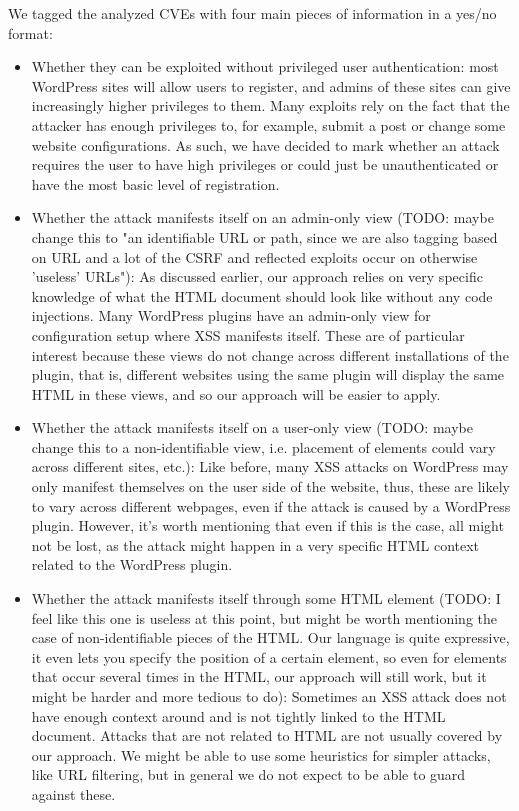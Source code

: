 We tagged the analyzed CVEs with four main pieces of information in a yes/no format:
\begin{itemize}
	\item Whether they can be exploited without privileged user authentication: most WordPress sites will allow users to register, and admins of these sites can give increasingly higher privileges to them. Many exploits rely on the fact that the attacker has enough privileges to, for example, submit a post or change some website configurations. As such, we have decided to mark whether an attack requires the user to have high privileges or could just be unauthenticated or have the most basic level of registration. 
	\item Whether the attack manifests itself on an admin-only view (TODO: maybe change this to "an identifiable URL or path, since we are also tagging based on URL and a lot of the CSRF and reflected exploits occur on otherwise 'useless' URLs"): As discussed earlier, our approach relies on very specific knowledge of what the HTML document should look like without any code injections. Many WordPress plugins have an admin-only view for configuration setup where \ac{XSS} manifests itself. These are of particular interest because these views do not change across different installations of the plugin, that is, different websites using the same plugin will display the same HTML in these views, and so our approach will be easier to apply.
	\item Whether the attack manifests itself on a user-only view (TODO: maybe change this to a non-identifiable view, i.e. placement of elements could vary across different sites, etc.): Like before, many \ac{XSS} attacks on WordPress may only manifest themselves on the user side of the website, thus, these are likely to vary across different webpages, even if the attack is caused by a WordPress plugin. However, it's worth mentioning that even if this is the case, all might not be lost, as the attack might happen in a very specific HTML context related to the WordPress plugin.
	\item Whether the attack manifests itself through some HTML element (TODO: I feel like this one is useless at this point, but might be worth mentioning the case of non-identifiable pieces of the HTML. Our language is quite expressive, it even lets you specify the position of a certain element, so even for elements that occur several times in the HTML, our approach will still work, but it might be harder and more tedious to do): Sometimes an \ac{XSS} attack does not have enough context around and is not tightly linked to the HTML document. Attacks that are not related to HTML are not usually covered by our approach. We might be able to use some heuristics for simpler attacks, like URL filtering, but in general we do not expect to be able to guard against these.
\end{itemize}

